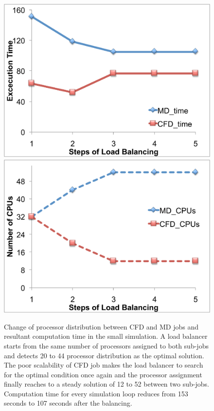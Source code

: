 \documentclass[conference,final]{IEEEtran}
\begin{document}
\begin{figure}
\centering
\includegraphics[scale=0.3]{fig6_1.pdf}
\linebreak
\includegraphics[scale=0.3]{fig6_2.pdf}
\caption{\small Change of processor distribution between CFD and MD
  jobs and resultant computation time in the small simulation. A load
  balancer starts from the same number of processors assigned to both
  sub-jobs and detects 20 to 44 processor distribution as the optimal
  solution. The poor scalability of CFD job makes the load balancer to
  search for the optimal condition once again and the processor
  assignment finally reaches to a steady solution of 12 to 52 between
  two sub-jobs. Computation time for every simulation loop reduces
  from 153 seconds to 107 seconds after the balancing.}
\label{Fig:LBSmall}
\end{figure}
\end{document}
